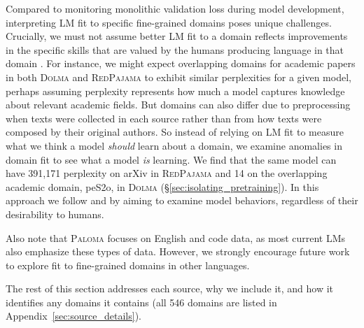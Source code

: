 Compared to monitoring monolithic validation loss during model development, interpreting LM fit to specific fine-grained domains poses unique challenges. Crucially, we must not assume better LM fit to a domain reflects improvements in the specific skills that are valued by the humans producing language in that domain \citep{Diaz2023ScalingLD}. For instance, we might expect overlapping domains for academic papers in both \textsc{Dolma} and \textsc{RedPajama} to exhibit similar perplexities for a given model, perhaps assuming perplexity represents how much a model captures knowledge about relevant academic fields. But domains can also differ due to preprocessing when texts were collected in each source rather than from how texts were composed by their original authors. So instead of relying on LM fit to measure what we think a model \textit{should} learn about a domain, we examine anomalies in domain fit to see what a model \textit{is} learning. We find that the same model can have 391,171 perplexity on arXiv in \textsc{RedPajama} and 14 on the overlapping academic domain, peS2o, in \textsc{Dolma} (\S\ref{sec:isolating_pretraining}). In this approach we follow \citet{Holtzman2023GenerativeMA} and \citet{McCoy2023EmbersOA} by aiming to examine model behaviors, regardless of their desirability to humans.

Also note that \textsc{Paloma} focuses on English and code data, as most current LMs also emphasize these types of data. However, we strongly encourage future work to explore fit to fine-grained domains in other languages. 

The rest of this section addresses each source, why we include it, and how it identifies any domains it contains (all 546 domains are listed in Appendix~\ref{sec:source_details}).

